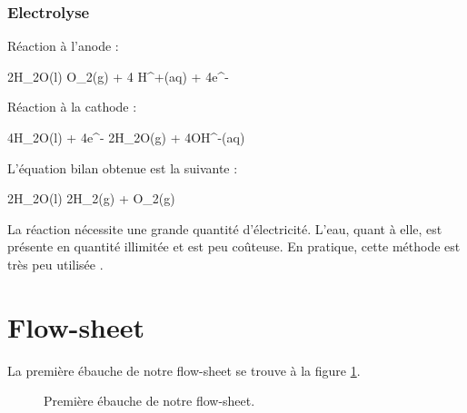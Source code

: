\documentclass{article}
\begin{document}
		\subsubsection{Electrolyse}
		Réaction à l'anode : 
		
		\begin{chemmath}
			2H_2O(l) \longrightarrow O_2(g) + 4 H^+(aq) + 4e^-
		\end{chemmath}
		
		Réaction à la cathode :
		
		\begin{chemmath}
			4H_2O(l) + 4e^- \longrightarrow 2H_2O(g) + 4OH^-(aq)
		\end{chemmath}
		
		L'équation bilan obtenue est la suivante :
		
		\begin{chemmath}
			2H_2O(l) \longrightarrow 2H_2(g) + O_2(g)
		\end{chemmath}
		
	La réaction nécessite une grande quantité d'électricité. L'eau, quant à elle, est présente en quantité illimitée 
	et est peu coûteuse. En pratique, cette méthode est très peu utilisée \cite{wiki-h2}.
	
	\section{Flow-sheet}
	La première ébauche de notre flow-sheet se trouve à la figure \ref{flow-sheet}.
	
	\begin{figure}[ht!]
		\centering
		\caption{Première ébauche de notre flow-sheet.}
		\label{flow-sheet}
	\end{figure}
\end{document}
